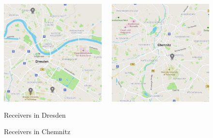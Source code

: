 \documentclass[aspectratio=169]{beamer}
\begin{document}
\begin{frame}
\begin{figure}
\begin{columns}
\begin{center}
  \includegraphics[height=0.65\textheight]{figs/map_dresden.jpg}
  \caption{Receivers in Dresden}
\end{center}
\begin{center}
  \includegraphics[height=0.65\textheight]{figs/map_chemnitz.jpg}
  \caption{Receivers in Chemnitz}
\end{center}
\end{columns}
\end{figure}

\end{frame}
\end{document}
